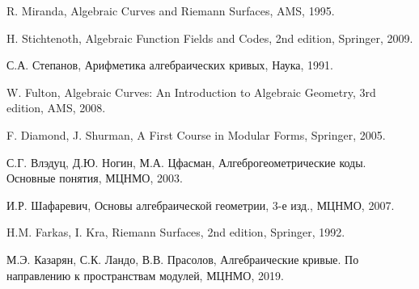 \documentclass[a4paper, 12pt]{article}
\begin{document}
\begin{thebibliography}{Stich}

R. Miranda, Algebraic Curves and Riemann Surfaces, AMS, 1995.

H. Stichtenoth, Algebraic Function Fields and Codes, 2nd edition, Springer, 2009.

С.А. Степанов, Арифметика алгебраических кривых, Наука, 1991.

W. Fulton, Algebraic Curves: An Introduction to Algebraic Geometry, 3rd edition, AMS, 2008.

F. Diamond, J. Shurman, A First Course in Modular Forms, Springer, 2005.

С.Г. Влэдуц, Д.Ю. Ногин, М.А. Цфасман, Алгеброгеометрические коды. Основные понятия, МЦНМО, 2003.

И.Р. Шафаревич, Основы алгебраической геометрии, 3-е изд., МЦНМО, 2007.

H.M. Farkas, I. Kra, Riemann Surfaces, 2nd edition, Springer, 1992.

М.Э. Казарян, С.К. Ландо, В.В. Прасолов, Алгебраические кривые. По направлению к пространствам модулей, МЦНМО, 2019.

\end{thebibliography}
\end{document}

